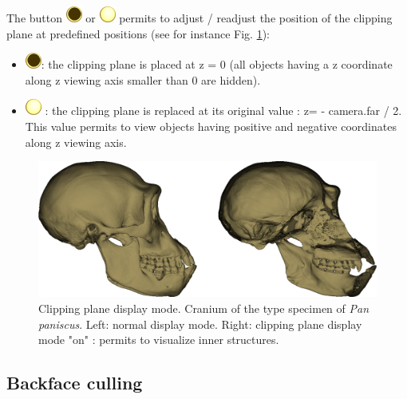 The button \includegraphics[scale=0.7]{images/06/display/cpon.png} or \includegraphics[scale=0.5]{images/06/display/cpoff.png}  permits to adjust / readjust the position of the clipping plane at predefined positions (see for instance Fig. \ref{cp_example}):
\begin{itemize}
\item  \includegraphics[scale=0.7]{images/06/display/cpon.png}: the clipping plane is placed at z = 0 (all objects having a z coordinate along
z viewing axis smaller than 0 are hidden).
\item	\includegraphics[scale=0.7]{images/06/display/cpoff.png} : the clipping plane is replaced at its original value : z= - camera.far / 2. This value permits to
view objects having positive and negative coordinates along z viewing axis.

\end{itemize}
\begin{figure}
  \centering
  \includegraphics[scale=0.4]{images/06/display/cp_example.png} 
	\caption{Clipping plane display mode. Cranium of the type specimen of \textit{Pan paniscus}. Left: normal display mode. Right: clipping plane display mode "on" : permits to visualize inner structures. }
\label{cp_example}
 
\end{figure}



\subsection{Backface culling} \label{Backface_culling}

